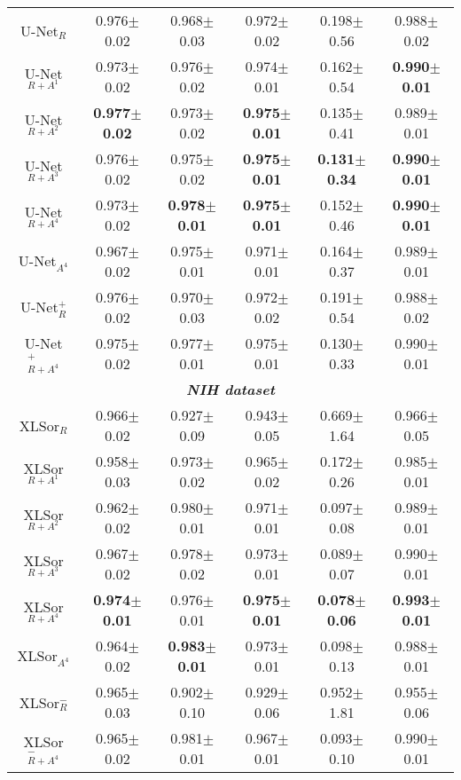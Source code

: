 \documentclass{midl} \usepackage{multirow}
\begin{document}
\begin{table}[t!]
{\begin{tabular}{|c|c|c|c|c|c|}
U-Net$_{R}$         & 0.976$\pm$0.02  & 0.968$\pm$0.03  & 0.972$\pm$0.02  & 0.198$\pm$0.56  & 0.988$\pm$0.02  \\
U-Net$_{R+A^1}$      & 0.973$\pm$0.02  & 0.976$\pm$0.02  & 0.974$\pm$0.01  & 0.162$\pm$0.54  & \bfseries 0.990$\pm$0.01  \\
U-Net$_{R+A^2}$      & \bfseries 0.977$\pm$0.02  & 0.973$\pm$0.02  & \bfseries 0.975$\pm$0.01  & 0.135$\pm$0.41  & 0.989$\pm$0.01  \\
U-Net$_{R+A^3}$      & 0.976$\pm$0.02  & 0.975$\pm$0.02  & \bfseries 0.975$\pm$0.01  & \bfseries 0.131$\pm$0.34  & \bfseries 0.990$\pm$0.01  \\
U-Net$_{R+A^4}$      & 0.973$\pm$0.02  & \bfseries 0.978$\pm$0.01  & \bfseries 0.975$\pm$0.01  & 0.152$\pm$0.46  & \bfseries 0.990$\pm$0.01  \\
U-Net$_{A^4}$        & 0.967$\pm$0.02  & 0.975$\pm$0.01  & 0.971$\pm$0.01  & 0.164$\pm$0.37  & 0.989$\pm$0.01  \\ \hline 
U-Net$_{R}^+$      &  0.976$\pm$0.02    &    0.970$\pm$0.03     &   0.972$\pm$0.02    &     0.191$\pm$0.54   &     0.988$\pm$0.02     \\
U-Net$_{R+A^4}^+$      &  0.975$\pm$0.02    &    0.977$\pm$0.01   &     0.975$\pm$0.01   &      0.130$\pm$0.33   &     0.990$\pm$0.01     \\ \hline \hline

\multicolumn{6}{|c|}{\textit{\textbf{NIH dataset}}}             \\ \hline
XLSor$_{R}$        & 0.966$\pm$0.02  & 0.927$\pm$0.09  & 0.943$\pm$0.05  & 0.669$\pm$1.64  & 0.966$\pm$0.05  \\
XLSor$_{R+A^1}$     & 0.958$\pm$0.03  & 0.973$\pm$0.02  & 0.965$\pm$0.02  & 0.172$\pm$0.26  & 0.985$\pm$0.01  \\
XLSor$_{R+A^2}$     & 0.962$\pm$0.02  & 0.980$\pm$0.01  & 0.971$\pm$0.01  & 0.097$\pm$0.08  & 0.989$\pm$0.01  \\
XLSor$_{R+A^3}$     & 0.967$\pm$0.02  & 0.978$\pm$0.02  & 0.973$\pm$0.01  & 0.089$\pm$0.07  & 0.990$\pm$0.01  \\
XLSor$_{R+A^4}$     & \bfseries 0.974$\pm$0.01  & 0.976$\pm$0.01  & \bfseries 0.975$\pm$0.01  & \bfseries 0.078$\pm$0.06  & \bfseries 0.993$\pm$0.01  \\
XLSor$_{A^4}$       & 0.964$\pm$0.02  & \bfseries 0.983$\pm$0.01  & 0.973$\pm$0.01  & 0.098$\pm$0.13  & 0.988$\pm$0.01  \\ \hline

XLSor$_{R}^-$      & 0.965$\pm$0.03 & 0.902$\pm$0.10 & 0.929$\pm$0.06 & 0.952$\pm$1.81 & 0.955$\pm$0.06  \\
XLSor$_{R+A^4}^-$      & 0.965$\pm$0.02 & 0.981$\pm$0.01 & 0.967$\pm$0.01 & 0.093$\pm$0.10 & 0.990$\pm$0.01  \\ \hline


\end{tabular}}
\end{table}
\end{document}
